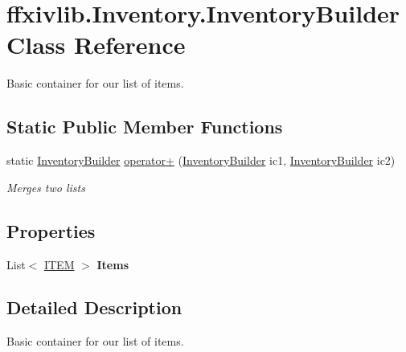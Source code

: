 \hypertarget{classffxivlib_1_1_inventory_1_1_inventory_builder}{\section{ffxivlib.\-Inventory.\-Inventory\-Builder Class Reference}
\label{classffxivlib_1_1_inventory_1_1_inventory_builder}
}


Basic container for our list of items.  


\subsection*{Static Public Member Functions}
\begin{DoxyCompactItemize}
\item 
static \hyperlink{classffxivlib_1_1_inventory_1_1_inventory_builder}{Inventory\-Builder} \hyperlink{classffxivlib_1_1_inventory_1_1_inventory_builder_abe01b1e7492bea9cf2e49095ebab1f1f}{operator+} (\hyperlink{classffxivlib_1_1_inventory_1_1_inventory_builder}{Inventory\-Builder} ic1, \hyperlink{classffxivlib_1_1_inventory_1_1_inventory_builder}{Inventory\-Builder} ic2)
\begin{DoxyCompactList}\small\item\em Merges two lists \end{DoxyCompactList}\end{DoxyCompactItemize}
\subsection*{Properties}
\begin{DoxyCompactItemize}
\item 
\hypertarget{classffxivlib_1_1_inventory_1_1_inventory_builder_a036618d994cb14bdfe10684ff5928a39}{List$<$ \hyperlink{structffxivlib_1_1_inventory_1_1_i_t_e_m}{I\-T\-E\-M} $>$ {\bfseries Items}}\label{classffxivlib_1_1_inventory_1_1_inventory_builder_a036618d994cb14bdfe10684ff5928a39}

\end{DoxyCompactItemize}


\subsection{Detailed Description}
Basic container for our list of items. 



